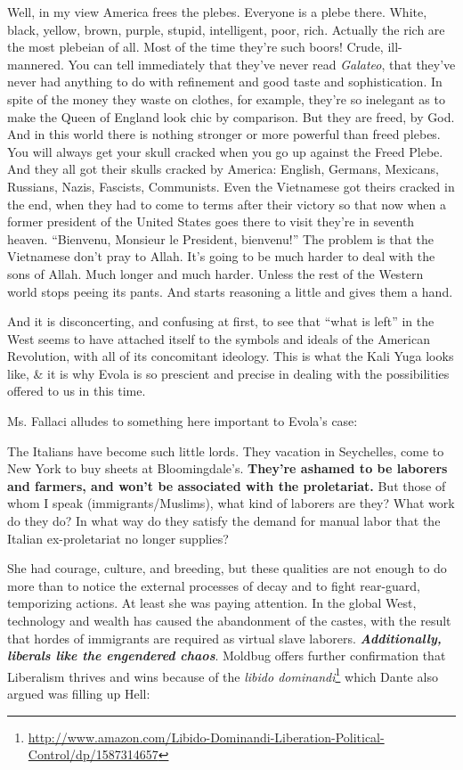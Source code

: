 \begin{quotex}
Well, in my view America frees the plebes. Everyone is a plebe there. White, black, yellow, brown, purple, stupid, intelligent, poor, rich. Actually the rich are the most plebeian of all. Most of the time they're such boors! Crude, ill-mannered. You can tell immediately that they've never read \emph{Galateo}, that they've never had anything to do with refinement and good taste and sophistication. In spite of the money they waste on clothes, for example, they're so inelegant as to make the Queen of England look chic by comparison. But they are freed, by God. And in this world there is nothing stronger or more powerful than freed plebes. You will always get your skull cracked when you go up against the Freed Plebe. And they all got their skulls cracked by America: English, Germans, Mexicans, Russians, Nazis, Fascists, Communists. Even the Vietnamese got theirs cracked in the end, when they had to come to terms after their victory so that now when a former president of the United States goes there to visit they're in seventh heaven. ``Bienvenu, Monsieur le President, bienvenu!'' The problem is that the Vietnamese don't pray to Allah. It's going to be much harder to deal with the sons of Allah. Much longer and much harder. Unless the rest of the Western world stops peeing its pants. And starts reasoning a little and gives them a hand.
\end{quotex}


And it is disconcerting, and confusing at first, to see that ``what is left'' in the West seems to have attached itself to the symbols and ideals of the American Revolution, with all of its concomitant ideology. This is what the Kali Yuga looks like, \& it is why Evola is so prescient and precise in dealing with the possibilities offered to us in this time.

Ms. Fallaci alludes to something here important to Evola's case:

\begin{quotex}
The Italians have become such little lords. They vacation in Seychelles, come to New York to buy sheets at Bloomingdale's. \textbf{They're ashamed to be laborers and farmers, and won't be associated with the proletariat.} But those of whom I speak (immigrants/Muslims), what kind of laborers are they? What work do they do? In what way do they satisfy the demand for manual labor that the Italian ex-proletariat no longer supplies?
\end{quotex}


She had courage, culture, and breeding, but these qualities are not enough to do more than to notice the external processes of decay and to fight rear-guard, temporizing actions. At least she was paying attention. In the global West, technology and wealth has caused the abandonment of the castes, with the result that hordes of immigrants are required as virtual slave laborers. \textbf{\emph{Additionally, liberals like the engendered chaos}}. Moldbug offers further confirmation that Liberalism thrives and wins because of the \emph{libido dominandi}\footnote{\url{http://www.amazon.com/Libido-Dominandi-Liberation-Political-Control/dp/1587314657}} which Dante also argued was filling up Hell:

